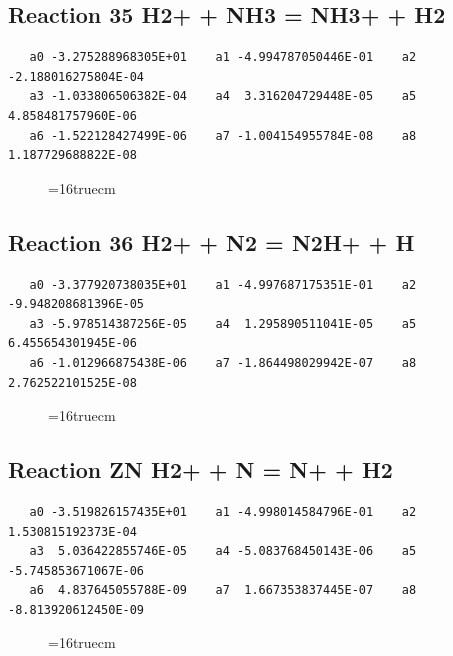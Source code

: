 \documentclass[12pt,dvipdfm]{article}
\begin{document}
\subsection{
Reaction 35 H2+ + NH3 = NH3+ + H2}
\begin{small}\begin{verbatim}
   a0 -3.275288968305E+01    a1 -4.994787050446E-01    a2 -2.188016275804E-04
   a3 -1.033806506382E-04    a4  3.316204729448E-05    a5  4.858481757960E-06
   a6 -1.522128427499E-06    a7 -1.004154955784E-08    a8  1.187729688822E-08
   \end{verbatim}\end{small}
\begin{figure}[h!] \label{n2rates}
\epsfxsize=16truecm
\end{figure}
\newpage

\subsection{
Reaction 36 H2+ + N2 = N2H+ + H}
\begin{small}\begin{verbatim}
   a0 -3.377920738035E+01    a1 -4.997687175351E-01    a2 -9.948208681396E-05
   a3 -5.978514387256E-05    a4  1.295890511041E-05    a5  6.455654301945E-06
   a6 -1.012966875438E-06    a7 -1.864498029942E-07    a8  2.762522101525E-08
   \end{verbatim}\end{small}
\begin{figure}[h!] \label{n2rates}
\epsfxsize=16truecm
\end{figure}
\newpage

\subsection{
Reaction ZN H2+ + N = N+ + H2}
\begin{small}\begin{verbatim}
   a0 -3.519826157435E+01    a1 -4.998014584796E-01    a2  1.530815192373E-04
   a3  5.036422855746E-05    a4 -5.083768450143E-06    a5 -5.745853671067E-06
   a6  4.837645055788E-09    a7  1.667353837445E-07    a8 -8.813920612450E-09
   \end{verbatim}\end{small}
\begin{figure}[h!] \label{n2rates}
\epsfxsize=16truecm
\end{figure}
\newpage
\end{document}
